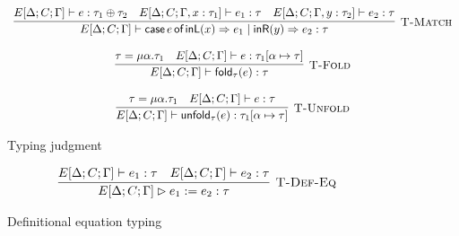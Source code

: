 \begin{figure}
\[\begin{array}{c}
      \labinfer[T-Match]{E[\Delta;C;\Gamma] \vdash \matchWith{e} \inL(x) \Ra e_1 \mid \inR(y) \Ra e_2 : \tau}
        {E[\Delta;C;\Gamma] \vdash e : \tau_1 \Either \tau_2
        &E[\Delta;C;\Gamma, x : \tau_1] \vdash e_1 : \tau
        &E[\Delta;C;\Gamma, y : \tau_2] \vdash e_2 : \tau}
      \\\\
      \labinfer[T-Fold]{E[\Delta;C;\Gamma] \vdash \fold_\tau(e) : \tau}
        {\tau = \mu\alpha.\tau_1 & E[\Delta;C;\Gamma] \vdash e : \tau_1[\alpha\mapsto\tau]}
      \\\\
      \labinfer[T-Unfold]{E[\Delta;C;\Gamma] \vdash \unfold_\tau(e) : \tau_1[\alpha\mapsto\tau]}
        {\tau = \mu\alpha.\tau_1 & E[\Delta;C;\Gamma] \vdash e : \tau}
    \end{array}
  \]
  \caption{Typing judgment}
  \label{fig:typing-judgment}
\end{figure}

\begin{figure}
  \[
    \begin{array}{c}
      \labinfer[T-Def-Eq]{E[\Delta;C;\Gamma] \rhd e_1 \defeq e_2 : \tau}
        {E[\Delta;C;\Gamma] \vdash e_1 : \tau
        &E[\Delta;C;\Gamma] \vdash e_2 : \tau}
    \end{array}
  \]
  \caption{Definitional equation typing}
  \label{fig:def-eq}
\end{figure}


